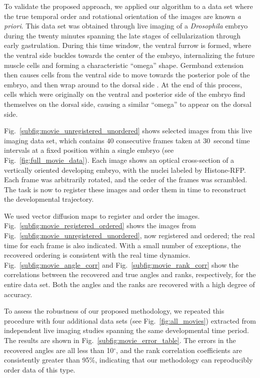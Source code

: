 \documentclass{pnastwo}
\newcommand{\fig}[0]{Fig.}
\begin{document}
\begin{article}
To validate the proposed approach, we applied our algorithm to a data set where the true temporal order and rotational orientation of the images are known {\em a priori}.
%
This data set was obtained through live imaging of a {\it Drosophila} embryo during the twenty minutes spanning the late stages of cellularization through early gastrulation.
%
During this time window, the ventral furrow is formed, where the ventral side buckles towards the center of the embryo, internalizing the future muscle cells and forming a characteristic ``omega'' shape.
%
Germband extension then causes cells from the ventral side to move towards the posterior pole of the embryo, and then wrap around to the dorsal side \cite{leptin2005gastrulation}.
%
At the end of this process, cells which were originally on the ventral and posterior side of the embryo find themselves on the dorsal side, causing a similar ``omega'' to appear on the dorsal side.

\fig~\ref{subfig:movie_unregistered_unordered} shows selected images from this live imaging data set, which contains $40$ consecutive frames taken at $30$~second time intervals at a fixed position within a single embryo (see \fig~\ref{fig:full_movie_data}).
%
Each image shows an optical cross-section of a vertically oriented developing embryo, with the nuclei labeled by Histone-RFP.
%
Each frame was arbitrarily rotated, and the order of the frames was scrambled.
%
The task is now to register these images and order them in time to reconstruct the developmental trajectory.

We used vector diffusion maps to register and order the images. 
%
\fig~\ref{subfig:movie_registered_ordered} shows the images from \fig~\ref{subfig:movie_unregistered_unordered}, now registered and ordered; the real time for each frame is also indicated.
%
With a small number of exceptions, the recovered ordering is consistent with the real time dynamics. 
%
\fig~\ref{subfig:movie_angle_corr} and \fig~\ref{subfig:movie_rank_corr}  show the correlations between the recovered and true angles and ranks, respectively, for the entire data set. 
%
Both the angles and the ranks are recovered with a high degree of accuracy.

To assess the robustness of our proposed methodology, we repeated this procedure with four additional data sets (see \fig~\ref{fig:all_movies}) extracted from independent live imaging studies spanning the same developmental time period. 
%
The results are shown in \fig~\ref{subfig:movie_error_table}. 
%
The errors in the recovered angles are all less than 10$^\circ$, and the rank correlation coefficients are consistently greater than 95\%, indicating that our methodology can reproducibly order data of this type. 


\end{article}
\end{document}
